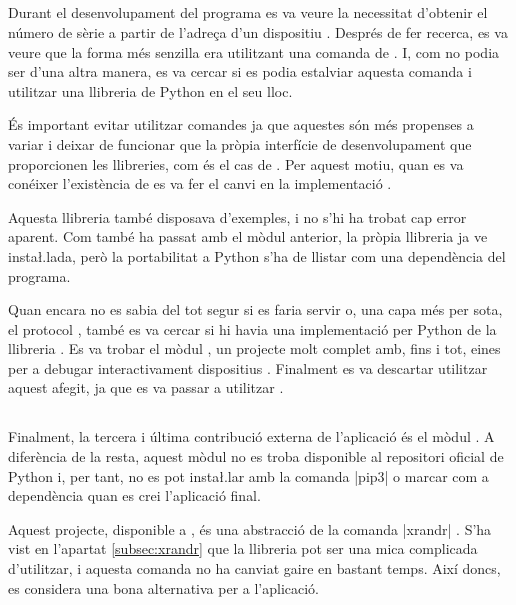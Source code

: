 \subsection{}

Durant el desenvolupament del programa es va veure la necessitat d'obtenir el
número de sèrie a partir de l'adreça d'un dispositiu . Després de fer
recerca, es va veure que la forma més senzilla era utilitzant una comanda
de . I, com no podia ser d'una altra manera, es va cercar si es podia
estalviar aquesta comanda i utilitzar una llibreria de Python en el seu lloc.

És important evitar utilitzar comandes ja que aquestes són més propenses a
variar i deixar de funcionar que la pròpia interfície de desenvolupament que
proporcionen les llibreries, com és el cas de . Per aquest motiu,
quan es va conéixer l'existència de  es va fer el canvi en la
implementació \cite{Pyudev}.

Aquesta llibreria també disposava d'exemples, i no s'hi ha trobat cap
error aparent. Com també ha passat amb el mòdul anterior, la pròpia llibreria
ja ve insta\l.lada, però la portabilitat a Python s'ha de llistar com una
dependència del programa.

Quan encara no es sabia del tot segur si es faria servir  o, una capa
més per sota, el protocol , també es va cercar si hi havia una
implementació per Python de la llibreria . Es va trobar el mòdul
, un projecte molt complet amb, fins i tot, eines per a
debugar interactivament dispositius  \cite{CpythonHid}.
Finalment es va descartar utilitzar
aquest afegit, ja que es va passar a utilitzar .

\subsection{}
\label{subsec:pyrandr}

Finalment, la tercera i última contribució externa de l'aplicació és el
mòdul . A diferència de la resta, aquest mòdul no es troba
disponible al repositori oficial de Python  i, per tant, no es pot
insta\l.lar amb la comanda \ord|pip3| o marcar com a dependència quan es crei
l'aplicació final.

Aquest projecte, disponible a , és una abstracció de la comanda
\ord|xrandr| \cite{Pyrandr}. S'ha vist en l'apartat \ref{subsec:xrandr} que la
llibreria
 pot ser una mica complicada d'utilitzar, i aquesta comanda no ha
canviat gaire en bastant temps. Així doncs, es considera una bona alternativa
per a l'aplicació.

